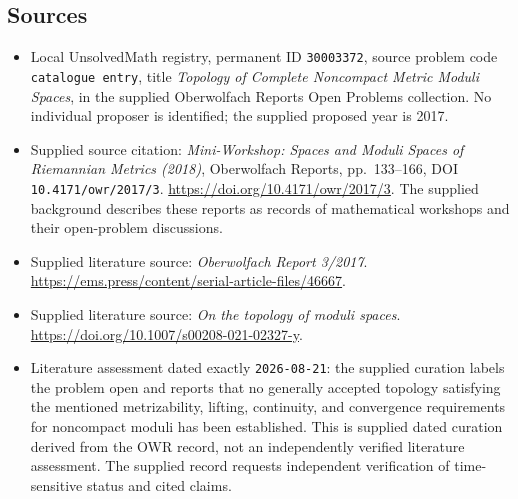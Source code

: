 \documentclass[11pt]{article}
\begin{document}
\subsection{Sources}
\begin{itemize}
\item Local UnsolvedMath registry, permanent ID \texttt{30003372}, source problem code \texttt{catalogue entry}, title \emph{Topology of Complete Noncompact Metric Moduli Spaces}, in the supplied Oberwolfach Reports Open Problems collection. No individual proposer is identified; the supplied proposed year is 2017.
\item Supplied source citation: \emph{Mini-Workshop: Spaces and Moduli Spaces of Riemannian Metrics (2018)}, Oberwolfach Reports, pp.\ 133--166, DOI \texttt{10.4171/owr/2017/3}. \url{https://doi.org/10.4171/owr/2017/3}. The supplied background describes these reports as records of mathematical workshops and their open-problem discussions.
\item Supplied literature source: \emph{Oberwolfach Report 3/2017}. \url{https://ems.press/content/serial-article-files/46667}.
\item Supplied literature source: \emph{On the topology of moduli spaces}. \url{https://doi.org/10.1007/s00208-021-02327-y}.
\item Literature assessment dated exactly \texttt{2026-08-21}: the supplied curation labels the problem open and reports that no generally accepted topology satisfying the mentioned metrizability, lifting, continuity, and convergence requirements for noncompact moduli has been established. This is supplied dated curation derived from the OWR record, not an independently verified literature assessment. The supplied record requests independent verification of time-sensitive status and cited claims.
\end{itemize}
\end{document}

